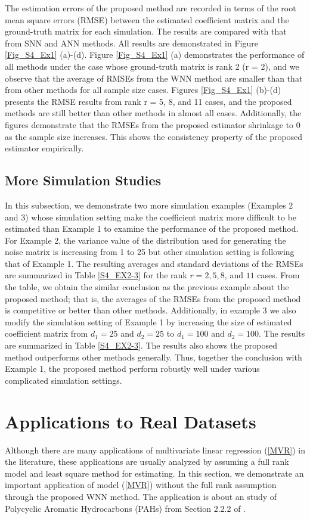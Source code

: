 \documentclass[12pt]{article}
\begin{document}
The estimation errors of the proposed method are recorded in terms of the root mean square errors (RMSE) between the estimated coefficient matrix and the ground-truth matrix for each simulation. The results are compared with that from SNN and ANN methods. All results are demonstrated in Figure \ref{Fig_S4_Ex1} (a)-(d). Figure \ref{Fig_S4_Ex1} (a) demonstrates the performance of all methods under the case whose ground-truth matrix is rank 2 (r = 2), and we observe that the average of RMSEs from the WNN method are smaller than that from other methods for all sample size cases. Figures \ref{Fig_S4_Ex1} (b)-(d) presents the RMSE results from rank r = 5, 8, and 11 cases, and the proposed methods are still better than other methods in almost all cases. Additionally, the figures demonstrate that the RMSEs from the proposed estimator shrinkage to 0 as the sample size increases. This shows the consistency property of the proposed estimator empirically.

\subsection{More Simulation Studies}
In this subsection, we demonstrate two more simulation examples (Examples 2 and 3) whose simulation setting make the coefficient matrix more difficult to be estimated than Example 1 to examine the performance of the proposed method. For Example 2, the variance value of the distribution used for generating the noise matrix is increasing from 1 to 25 but other simulation setting is following that of Example 1. The resulting averages and standard deviations of the RMSEs are summarized in Table \ref{S4_EX2-3} for the rank $r = 2, 5, 8$, and $11$ cases. From the table, we obtain the similar conclusion as the previous example about the proposed method; that is, the averages of the RMSEs from the proposed method is competitive or better than other methods. Additionally, in example 3 we also modify the simulation setting of Example 1 by increasing the size of estimated coefficient matrix from  $d_{1} = 25$ and $d_{2} = 25$ to $d_{1} = 100$ and $d_{2} = 100$.  The results are summarized in Table \ref{S4_EX2-3}. The results also shows the proposed method outperforms other methods generally. Thus, together the conclusion with Example 1, the proposed method perform robustly well under various complicated simulation settings.

\section{Applications to Real Datasets}
Although there are many applications of multivariate linear regression (\ref{MVR}) in the literature, these applications are usually analyzed by assuming a full rank model and least square method for estimating. In this section, we demonstrate an important application of model (\ref{MVR}) without the full rank assumption through the proposed WNN method. The application is about an study of Polycyclic Aromatic Hydrocarbons (PAHs) from Section 2.2.2 of \citet{isenmann2008modern}.
\end{document}
